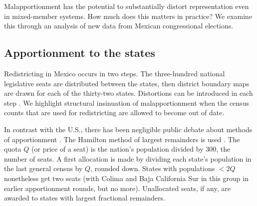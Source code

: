 \documentclass[letter,12pt]{article}
\begin{document}

Malapportionment has the potential to substantially distort representation even in mixed-member systems. How much does this matters in practice? We examine this through an analysis of new data from Mexican congressional elections. 

\subsection{Apportionment to the states}

Redistricting in Mexico occurs in two steps. The three-hundred national legislative seats are distributed between the states, then district boundary maps are drawn for each of the thirty-two states. Distortions can be introduced in each step \citep[see][]{snyder.samuelsMalapp2004}. We highlight structural insinuation of malapportionment when the census counts that are used for redistricting are allowed to become out of date.


In contrast with the U.S., there has been negligible public debate about methods of apportionment \citep{szpiro.numbersRule.2010,balinski.rodriguez.1996}. The Hamilton method of largest remainders is used \citep[][:10]{balinskiYoung2001FairRep}. The quota $Q$ (or price of a seat) is the nation's population divided by 300, the number of seats. A first allocation is made by dividing each state's population in the last general census by $Q$, rounded down. States with populations $<2Q$ nonetheless get two seats (with Colima and Baja California Sur in this group in earlier apportionment rounds, but no more). Unallocated seats, if any, are awarded to states with largest fractional remainders. 
\end{document}
